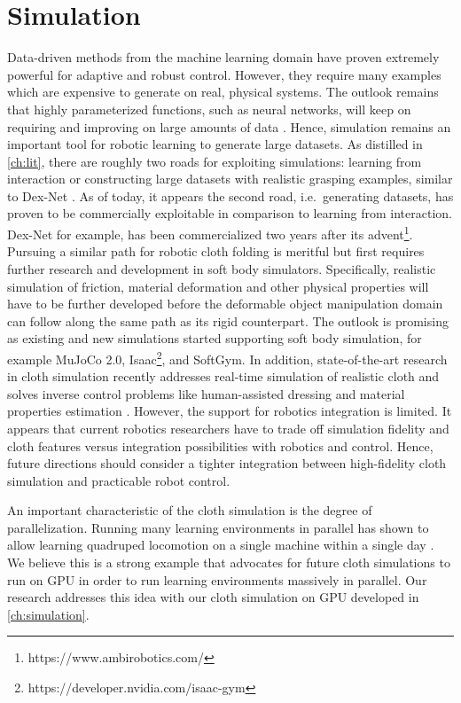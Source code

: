 \documentclass[\home/main.tex]{subfiles}
\begin{document}
\section{Simulation} \label{sec:towards_sim}
Data-driven methods from the machine learning domain have proven extremely powerful for adaptive and robust control. However, they require many examples which are expensive to generate on real, physical systems. The outlook remains that highly parameterized functions, such as neural networks, will keep on requiring and improving on large amounts of data \autocite{sun2017revisiting}. Hence, simulation remains an important tool for robotic learning to generate large datasets. As distilled in \cref{ch:lit}, there are roughly two roads for exploiting simulations: learning from interaction or constructing large datasets with realistic grasping examples, similar to Dex-Net \autocite{dexnet2}. As of today, it appears the second road, i.e.\ generating datasets, has proven to be commercially exploitable in comparison to learning from interaction. Dex-Net for example, has been commercialized two years after its advent\footnote{https://www.ambirobotics.com/}. Pursuing a similar path for robotic cloth folding is meritful but first requires further research and development in soft body simulators. Specifically,
realistic simulation of friction, material deformation and other physical properties will have to be further developed before the deformable object manipulation domain can follow along the same path as its rigid counterpart. The outlook is promising as  existing and new simulations started supporting soft body simulation, for example MuJoCo 2.0, Isaac\footnote{https://developer.nvidia.com/isaac-gym}, and SoftGym. In addition, state-of-the-art research in cloth simulation recently addresses real-time simulation of realistic cloth and solves inverse control problems like human-assisted dressing and material properties estimation \autocite{Junbang2019,li2021diffcloth}. However, the support for robotics integration is limited. It appears that current robotics researchers have to trade off simulation fidelity and cloth features versus integration possibilities with robotics and control. Hence, future directions should consider a tighter integration between high-fidelity cloth simulation and practicable robot control.

An important characteristic of the cloth simulation is the degree of parallelization. Running many learning environments in parallel has shown to allow learning quadruped locomotion on a single machine within a single day \autocite{rudin2021learning}. We believe this is a strong example that advocates for future cloth simulations to run on GPU in order to run learning environments massively in parallel. Our research addresses this idea with our cloth simulation on \gls{GPU} developed in \cref{ch:simulation}.    
\end{document}
